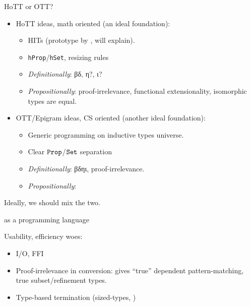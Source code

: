 \begin{subsecframe}{HoTT or OTT?}

  \begin{itemize}
  \item 
    HoTT ideas, math oriented (an ideal foundation):
    \begin{itemize}
    \item HITs (prototype by ,  will
      explain).
    \item<presentation:only@0> \texttt{hProp}/\texttt{hSet}, resizing rules
    \item<presentation:only@0> \alert{\emph{Definitionally}}: βδ, η?, ι? 
    \item \alert{\emph{Propositionally}}: proof-irrelevance, functional extensionality,
      isomorphic types are equal.
    \end{itemize}
  \item 
    OTT/Epigram ideas, CS oriented (another ideal foundation):
    \begin{itemize}
    \item Generic programming on inductive types universe.
    \item<presentation:only@0> Clear $\texttt{Prop}$/$\texttt{Set}$ separation
    \item \alert{\emph{Definitionally}}: βδηι, proof-irrelevance.
    \item \alert{\emph{Propositionally}}: 
    \end{itemize}
  \end{itemize}
  
  Ideally, we should mix the two.
\end{subsecframe}

\begin{subsecframe}{\Coq as a programming language}

  Usability, efficiency woes:
  \begin{itemize}
  \item I/O, FFI
  \item Proof-irrelevance in conversion: gives ``true'' dependent
    pattern-matching, true subset/refinement types.
  \item Type-based termination (sized-types, )
  \end{itemize}
\end{subsecframe}




